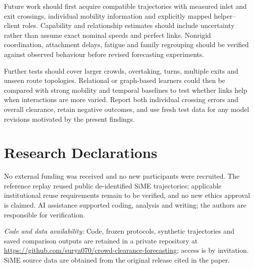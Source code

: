 Future work should first acquire compatible trajectories with measured inlet and exit crossings, individual mobility information and explicitly mapped helper--client roles. Capability and relationship estimates should include uncertainty rather than assume exact nominal speeds and perfect links. Nonrigid coordination, attachment delays, fatigue and family regrouping should be verified against observed behaviour before revised forecasting experiments.

Further tests should cover larger crowds, overtaking, turns, multiple exits and unseen route topologies. Relational or graph-based learners could then be compared with strong mobility and temporal baselines to test whether links help when interactions are more varied. Report both individual crossing errors and overall clearance, retain negative outcomes, and use fresh test data for any model revisions motivated by the present findings.

\section*{Research Declarations}
No external funding was received and no new participants were recruited. The reference replay reused public de-identified SiME trajectories; applicable institutional reuse requirements remain to be verified, and no new ethics approval is claimed. AI assistance supported coding, analysis and writing; the authors are responsible for verification.

\textit{Code and data availability:} Code, frozen protocols, synthetic trajectories and saved comparison outputs are retained in a private repository at \url{https://github.com/surya070/crowd-clearance-forecasting}; access is by invitation. SiME source data are obtained from the original release cited in the paper.

